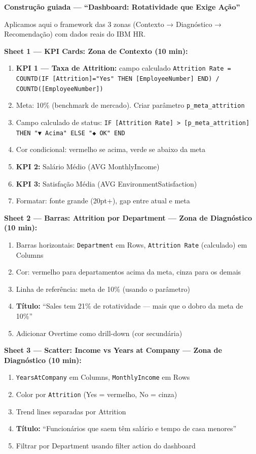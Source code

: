 \begin{SolvedBox}
\textbf{Construção guiada — ``Dashboard: Rotatividade que Exige Ação''}

Aplicamos aqui o framework das 3 zonas (Contexto → Diagnóstico → Recomendação)
com dados reais do IBM HR.

\textbf{Sheet 1 — KPI Cards: Zona de Contexto (10 min):}
\begin{enumerate}
  \item \textbf{KPI 1 — Taxa de Attrition:} campo calculado
  \texttt{Attrition Rate = COUNTD(IF [Attrition]="Yes" THEN [EmployeeNumber] END)
  / COUNTD([EmployeeNumber])}
  \item Meta: 10\% (benchmark de mercado). Criar parâmetro \texttt{p\_meta\_attrition}
  \item Campo calculado de status:
  \texttt{IF [Attrition Rate] > [p\_meta\_attrition] THEN "▼ Acima" ELSE "◆ OK" END}
  \item Cor condicional: vermelho se acima, verde se abaixo da meta
  \item \textbf{KPI 2:} Salário Médio (AVG MonthlyIncome)
  \item \textbf{KPI 3:} Satisfação Média (AVG EnvironmentSatisfaction)
  \item Formatar: fonte grande (20pt+), gap entre atual e meta
\end{enumerate}

\textbf{Sheet 2 — Barras: Attrition por Department — Zona de Diagnóstico (10 min):}
\begin{enumerate}
  \item Barras horizontais: \texttt{Department} em Rows,
  \texttt{Attrition Rate} (calculado) em Columns
  \item Cor: vermelho para departamentos acima da meta, cinza para os demais
  \item Linha de referência: meta de 10\% (usando o parâmetro)
  \item \textbf{Título:} ``Sales tem 21\% de rotatividade —
  mais que o dobro da meta de 10\%''
  \item Adicionar Overtime como drill-down (cor secundária)
\end{enumerate}

\textbf{Sheet 3 — Scatter: Income vs Years at Company — Zona de Diagnóstico (10 min):}
\begin{enumerate}
  \item \texttt{YearsAtCompany} em Columns, \texttt{MonthlyIncome} em Rows
  \item Color por \texttt{Attrition} (Yes = vermelho, No = cinza)
  \item Trend lines separadas por Attrition
  \item \textbf{Título:} ``Funcionários que saem têm salário e tempo de casa menores''
  \item Filtrar por Department usando filter action do dashboard
\end{enumerate}


\end{SolvedBox}
